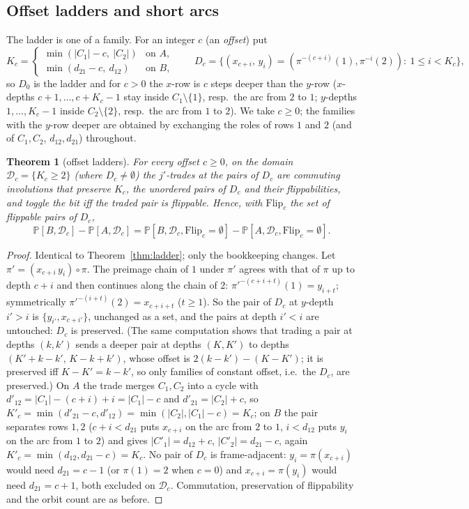 \documentclass[11pt]{article}
\newtheorem{theorem}{Theorem}[section]
\theoremstyle{definition}
\renewcommand{\Pr}{\mathbb{P}}
\begin{document}
\subsection{Offset ladders and short arcs}\label{sec:offsets}


The ladder is one of a family.  For an integer $c$ (an \emph{offset}) put
\[
K_c=\begin{cases}\min(|C_1|-c,\ |C_2|)&\text{on }A,\\
\min(d_{21}-c,\ d_{12})&\text{on }B,\end{cases}
\qquad
D_c=\bigl\{(x_{c+i},\,y_i)=(\pi^{-(c+i)}(1),\pi^{-i}(2)):\ 1\le i<K_c\bigr\},
\]
so $D_0$ is the ladder and for $c>0$ the $x$-row is $c$ steps deeper
than the $y$-row ($x$-depths $c+1,\dots,c+K_c-1$ stay inside
$C_1\setminus\{1\}$, resp.\ the arc from $2$ to $1$; $y$-depths
$1,\dots,K_c-1$ inside $C_2\setminus\{2\}$, resp.\ the arc from $1$ to
$2$).  We take $c\ge0$; the families with the $y$-row deeper are
obtained by exchanging the roles of rows $1$ and $2$ (and of
$C_1,C_2$, $d_{12},d_{21}$) throughout.

\begin{theorem}[offset ladders]\label{thm:ladderoffset}
For every offset $c\ge0$, on the domain $\mathcal D_c=\{K_c\ge2\}$
(where $D_c\ne\emptyset$) the $j'$-trades at the pairs of $D_c$ are commuting
involutions that preserve $K_c$, the unordered pairs of $D_c$ and their
flippabilities, and toggle the bit iff the traded pair is flippable.
Hence, with $\mathrm{Flip}_c$ the set of flippable pairs of $D_c$,
\[
\Pr[B,\mathcal D_c]-\Pr[A,\mathcal D_c]
=\Pr[B,\mathcal D_c,\mathrm{Flip}_c=\emptyset]-\Pr[A,\mathcal D_c,\mathrm{Flip}_c=\emptyset].
\]
\end{theorem}

\begin{proof}
Identical to Theorem~\ref{thm:ladder}; only the bookkeeping changes.
Let $\pi'=(x_{c+i}\,y_i)\circ\pi$.  The preimage chain of $1$ under
$\pi'$ agrees with that of $\pi$ up to depth $c+i$ and then continues
along the chain of $2$: $\pi'^{-(c+i+t)}(1)=y_{i+t}$; symmetrically
$\pi'^{-(i+t)}(2)=x_{c+i+t}$ ($t\ge1$).  So the pair of $D_c$ at
$y$-depth $i'>i$ is $\{y_{i'},x_{c+i'}\}$, unchanged as a set, and the
pairs at depth $i'<i$ are untouched: $D_c$ is preserved.  (The same
computation shows that trading a pair at depths $(k,k')$ sends a
deeper pair at depths $(K,K')$ to depths $(K'+k-k',\,K-k+k')$, whose
offset is $2(k-k')-(K-K')$; it is preserved iff $K-K'=k-k'$, so only
families of constant offset, i.e.\ the $D_c$, are preserved.)  On $A$
the trade merges $C_1,C_2$ into a cycle with
$d'_{12}=|C_1|-(c+i)+i=|C_1|-c$ and $d'_{21}=|C_2|+c$, so
$K'_c=\min(d'_{21}-c,d'_{12})=\min(|C_2|,|C_1|-c)=K_c$; on $B$ the pair
separates rows $1,2$ ($c+i<d_{21}$ puts $x_{c+i}$ on the arc from $2$
to $1$, $i<d_{12}$ puts $y_i$ on the arc from $1$ to $2$) and gives
$|C'_1|=d_{12}+c$, $|C'_2|=d_{21}-c$, again
$K'_c=\min(d_{12},d_{21}-c)=K_c$.  No pair of $D_c$ is frame-adjacent:
$y_i=\pi(x_{c+i})$ would need $d_{21}=c-1$ (or $\pi(1)=2$ when $c=0$)
and $x_{c+i}=\pi(y_i)$ would need $d_{21}=c+1$, both excluded on
$\mathcal D_c$.  Commutation,
preservation of flippability and the orbit count are as before.
\end{proof}
\end{document}
